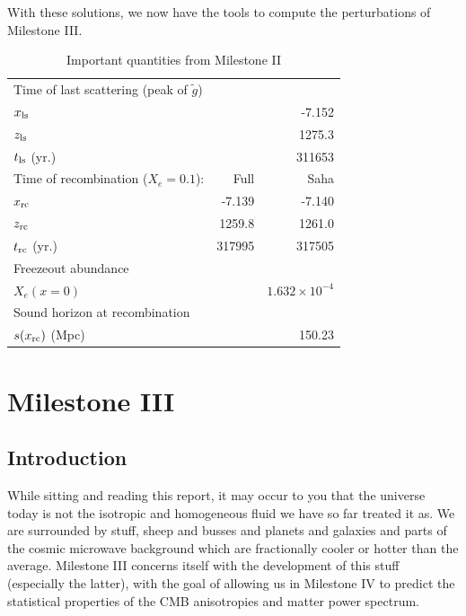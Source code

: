 \documentclass[aps,prl,twocolumn,groupedaddress,nofootinbib]{revtex4-2}
\begin{document}
With these solutions, we now have the tools to compute the perturbations of Milestone III.
\begin{table}[h]
    \caption{\label{tab:results2}Important quantities from Milestone II}
    \begin{ruledtabular}
        \begin{tabular}{l r r}
            \footnotesize{Time of last scattering (peak of $\tilde g$)}                         \\
            $x_{\rm{ls}}$                                       &        & -7.152               \\
            $z_{\rm{ls}}$                                       &        & 1275.3               \\
            $t_{\rm{ls}}$ (yr.)                                 &        & 311653               \\
            \hline
            \footnotesize{Time of recombination ($X_e = 0.1$):} & Full   & Saha                 \\
            $x_{\rm{rc}}$                                       & -7.139 & -7.140               \\
            $z_{\rm{rc}}$                                       & 1259.8 & 1261.0               \\
            $t_{\rm{rc}}$ (yr.)                                 & 317995 & 317505               \\
            \hline
            \footnotesize{Freezeout abundance}                                                  \\
            $X_e(x=0)$                                          &        & $1.632\times10^{-4}$ \\
            \hline
            \footnotesize{Sound horizon at recombination}                                       \\
            $s(x_{\rm{rc}})$ (Mpc)                              &        & 150.23               \\
        \end{tabular}
    \end{ruledtabular}
\end{table}
\section{Milestone III}
\subsection{Introduction}
While sitting and reading this report, it may occur to you that the universe today is not the isotropic and homogeneous fluid we have so far treated it as. We are surrounded by stuff, sheep and busses and planets and galaxies and parts of the cosmic microwave background which are fractionally cooler or hotter than the average. Milestone III concerns itself with the development of this stuff (especially the latter), with the goal of allowing us in Milestone IV to predict the statistical properties of the CMB anisotropies and matter power spectrum.
\end{document}
